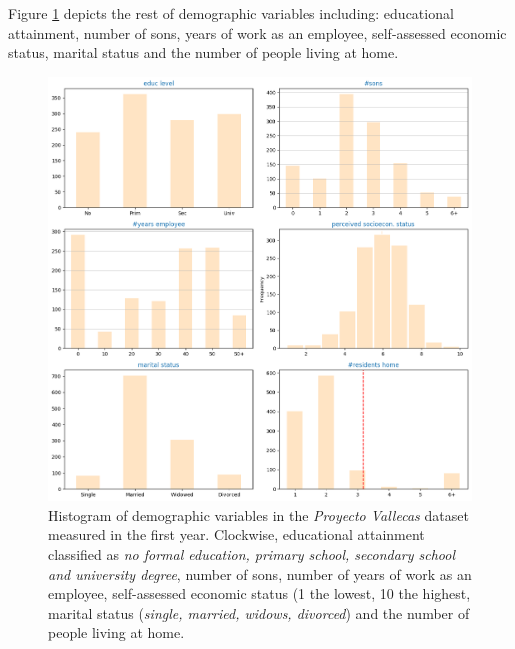 \documentclass[11pt]{article}
\theoremstyle{definition}
\theoremstyle{remark}
\begin{document}

Figure \ref{fig:demo} depicts the rest of demographic variables including: educational attainment, number of sons, years of work as an employee, self-assessed economic status, marital status and the number of people living at home.
\begin{figure}[H]
        \centering
        \includegraphics[keepaspectratio, width=\linewidth]{figures/Fig_demo}
        \caption{Histogram of demographic variables in the \emph{Proyecto Vallecas} dataset measured in the first year. Clockwise, educational attainment classified as \emph{no formal education, primary school, secondary school and university degree}, number of sons, number of years of work as an employee, self-assessed economic status (1 the lowest, 10 the highest, marital status (\emph{single, married, widows, divorced}) and the number of people living at home.} 
        \label{fig:demo}
\end{figure}
\end{document}
